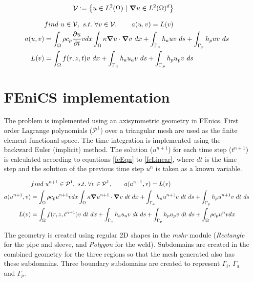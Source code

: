 \documentclass{article}
\begin{document}
\begin{align}
\mathcal{V} &:= \qty{u \in L^2(\Omega) ~|~ \grad u \in L^{2}(\Omega)^d}\label{vSpaces} 
\end{align} 
 
\begin{align}
&find ~u \in \mathcal{V},~s.t.~ \forall v \in \mathcal{V}, \qquad  a(u,v) = L(v) \label{weakEqn} \\
a(u,v) &= \int_\Omega \rho c_p \pdv{u}{t} v dx \int_\Omega\kappa\grad u \cdot \grad v ~dx  + \int_{\Gamma_a} h_a u v ~ds + \int_{\Gamma_p} h_p u v ~ds \label{bilinear} \\
L(v) &= \int_\Omega f(r,z,t) v ~dx + \int_{\Gamma_a} h_a u_a v ~ds + \int_{\Gamma_p} h_p u_p v ~ds \label{linear}
\end{align}

\section{FEniCS implementation}
The problem is implemented using an axisymmetric geometry in FEnics. First order Lagrange polynomials ($\mathcal{P}^1$) over a triangular mesh are used as the finite element functional space. The time integration is implemented using the backward Euler (implicit) method. The solution ($u^{n+1}$) for each time step ($t^{n+1}$) is calculated according to equations \ref{feEqn} to \ref{feLinear}, where $dt$ is the time step and the solution of the previous time step $u^n$ is taken as a known variable. 

\begin{align}
&find ~u^{n+1} \in \mathcal{P}^1,~s.t.~ \forall v \in \mathcal{P}^1, \qquad  a(u^{n+1},v) = L(v) \label{feEqn} \\
a(u^{n+1},v) &= \int_\Omega \rho c_p u^{n+1} v dx \int_\Omega \kappa \grad u^{n+1} \cdot \grad v ~dt ~dx  + \int_{\Gamma_a} h_a u^{n+1} v ~dt ~ds + \int_{\Gamma_p} h_p u^{n+1} v ~dt ~ds \label{feBilinear} \\
L(v) &= \int_\Omega f(r,z,t^{n+1})  v ~dt ~dx + \int_{\Gamma_a} h_a u_a v ~dt ~ds + \int_{\Gamma_p} h_p u_p v ~dt ~ds + \int_\Omega \rho c_p u^{n} v dx \label{feLinear}
\end{align}

The geometry is created using regular 2D shapes in the \textit{mshr} module (\textit{Rectangle} for the pipe and sleeve,  and \textit{Polygon} for the weld). Subdomains are created in the combined geometry for the three regions so that the mesh generated also has these subdomains. Three boundary subdomains are created to represent $\Gamma_i$, $\Gamma_a$ and $\Gamma_p$. 
\end{document}
